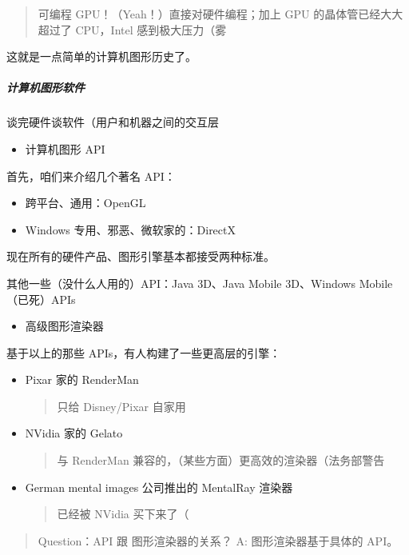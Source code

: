 \documentclass[
]{article}
\begin{document}
\begin{quote}
可编程 GPU！（Yeah！）直接对硬件编程；加上 GPU 的晶体管已经大大超过了
CPU，Intel 感到极大压力（雾
\end{quote}

这就是一点简单的计算机图形历史了。

\hypertarget{header-n110}{%
\subparagraph{计算机图形软件}\label{header-n110}}

谈完硬件谈软件（用户和机器之间的交互层

\begin{itemize}
\item
  计算机图形 API
\end{itemize}

首先，咱们来介绍几个著名 API：

\begin{itemize}
\item
  跨平台、通用：OpenGL
\item
  Windows 专用、邪恶、微软家的：DirectX
\end{itemize}

现在所有的硬件产品、图形引擎基本都接受两种标准。

其他一些（没什么人用的）API：Java 3D、Java Mobile 3D、Windows
Mobile（已死）APIs

\begin{itemize}
\item
  高级图形渲染器
\end{itemize}

基于以上的那些 APIs，有人构建了一些更高层的引擎：

\begin{itemize}
\item
  Pixar 家的 RenderMan

  \begin{quote}
  只给 Disney/Pixar 自家用
  \end{quote}
\item
  NVidia 家的 Gelato

  \begin{quote}
  与 RenderMan 兼容的，（某些方面）更高效的渲染器（法务部警告
  \end{quote}
\item
  German mental images 公司推出的 MentalRay 渲染器

  \begin{quote}
  已经被 NVidia 买下来了（
  \end{quote}
\end{itemize}

\begin{quote}
Question：API 跟 图形渲染器的关系？ A: 图形渲染器基于具体的 API。
\end{quote}
\end{document}
